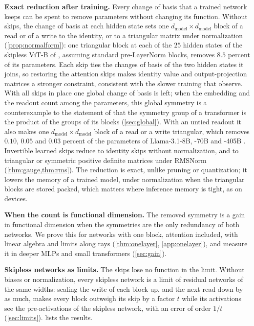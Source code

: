 \documentclass[10pt]{article}
\theoremstyle{definition}
\theoremstyle{remark}
\newcommand{\dm}{d_{\mathrm{model}}}
\newcommand{\para}[1]{\smallskip\noindent\textbf{#1}\hspace{0.5em}}
\begin{document}
\para{Exact reduction after training.} Every change of basis that a trained network keeps can be spent to remove parameters without changing its function. Without skips, the change of basis at each hidden state sets one $\dm \times \dm$ block of a read or of a write to the identity, or to a triangular matrix under normalization (\cref{prop:normalform}): one triangular block at each of the $25$ hidden states of the skipless ViT-B of \citet{ji2026cutting}, assuming standard pre-LayerNorm blocks, removes $8.5$ percent of its parameters. Each skip ties the changes of basis of the two hidden states it joins, so restoring the attention skips makes identity value and output-projection matrices a stronger constraint, consistent with the slower training that \citet{he2024simplifying} observe. With all skips in place one global change of basis is left; when the embedding and the readout count among the parameters, this global symmetry is a counterexample to the statement of \citet{wang2025gauge} that the symmetry group of a transformer is the product of the groups of its blocks (\cref{sec:global}). With an untied readout it also makes one $\dm \times \dm$ block of a read or a write triangular, which removes $0.10$, $0.05$ and $0.03$ percent of the parameters of Llama-3.1-8B, -70B and -405B \citep{grattafiori2024llama3}. Invertible learned skips reduce to identity skips without normalization, and to triangular or symmetric positive definite matrices under RMSNorm (\cref{thm:gauge,thm:rms}). The reduction is exact, unlike pruning or quantization; it lowers the memory of a trained model, under normalization when the triangular blocks are stored packed, which matters where inference memory is tight, as on devices.

\para{When the count is functional dimension.} The removed symmetry is a gain in functional dimension when the symmetries are the only redundancy of both networks. We prove this for networks with one block, attention included, with linear algebra and limits along rays (\cref{thm:onelayer}, \cref{app:onelayer}), and measure it in deeper MLPs and small transformers (\cref{sec:gain}).

\para{Skipless networks as limits.} The skips lose no function in the limit. Without biases or normalization, every skipless network is a limit of residual networks of the same widths: scaling the write of each block up, and the next read down by as much, makes every block outweigh its skip by a factor $t$ while its activations see the pre-activations of the skipless network, with an error of order $1/t$ (\cref{sec:limits}).  lists the results.
\end{document}
